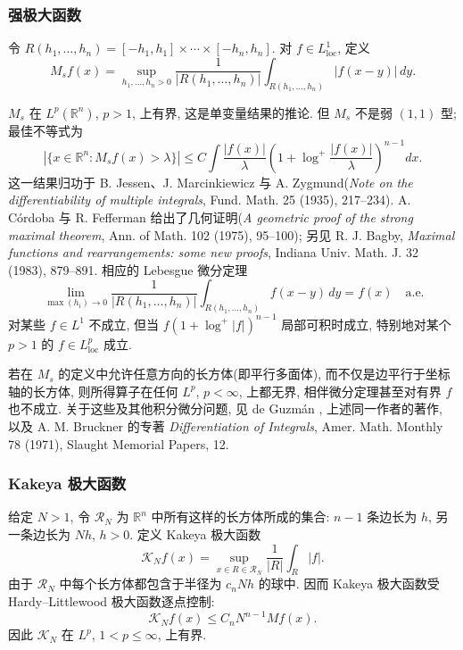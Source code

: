 \subsubsection{强极大函数}
\label{subsec:ch2-strong-maximal}
令 $R(h_1,\ldots,h_n)=[-h_1,h_1]\times\cdots\times[-h_n,h_n]$. 对 $f\in L^1_{\mathrm{loc}}$, 定义
\[
 M_sf(x)=\sup_{h_1,\ldots,h_n>0}\frac1{|R(h_1,\ldots,h_n)|}\int_{R(h_1,\ldots,h_n)}|f(x-y)|\,dy.
\]

\hypertarget{chapter-02-page-058}{}
$M_s$ 在 $L^p(\mathbb R^n)$, $p>1$, 上有界, 这是单变量结果的推论. 但 $M_s$ 不是弱 $(1,1)$ 型; 最佳不等式为
\[
 |\{x\in\mathbb R^n:M_sf(x)>\lambda\}|\le C\int\frac{|f(x)|}{\lambda}\left(1+\log^+\frac{|f(x)|}{\lambda}\right)^{n-1}dx.
\]
这一结果归功于 B. Jessen、J. Marcinkiewicz 与 A. Zygmund(\emph{Note on the differentiability of multiple integrals}, Fund. Math. 25 (1935), 217--234). A. Córdoba 与 R. Fefferman 给出了几何证明(\emph{A geometric proof of the strong maximal theorem}, Ann. of Math. 102 (1975), 95--100); 另见 R. J. Bagby, \emph{Maximal functions and rearrangements: some new proofs}, Indiana Univ. Math. J. 32 (1983), 879--891. 相应的 Lebesgue 微分定理
\[
 \lim_{\max(h_i)\to0}\frac1{|R(h_1,\ldots,h_n)|}\int_{R(h_1,\ldots,h_n)}f(x-y)\,dy=f(x)\quad\text{a.e.}
\]
对某些 $f\in L^1$ 不成立, 但当 $f(1+\log^+|f|)^{n-1}$ 局部可积时成立, 特别地对某个 $p>1$ 的 $f\in L^p_{\mathrm{loc}}$ 成立.

若在 $M_s$ 的定义中允许任意方向的长方体(即平行多面体), 而不仅是边平行于坐标轴的长方体, 则所得算子在任何 $L^p$, $p<\infty$, 上都无界, 相伴微分定理甚至对有界 $f$ 也不成立. 关于这些及其他积分微分问题, 见 de Guzmán , 上述同一作者的著作, 以及 A. M. Bruckner 的专著 \emph{Differentiation of Integrals}, Amer. Math. Monthly 78 (1971), Slaught Memorial Papers, 12.

\subsubsection{Kakeya 极大函数}
\label{subsec:ch2-kakeya-maximal}
给定 $N>1$, 令 $\mathcal R_N$ 为 $\mathbb R^n$ 中所有这样的长方体所成的集合: $n-1$ 条边长为 $h$, 另一条边长为 $Nh$, $h>0$. 定义 Kakeya 极大函数
\[
 \mathcal K_Nf(x)=\sup_{x\in R\in\mathcal R_N}\frac1{|R|}\int_R|f|.
\]
由于 $\mathcal R_N$ 中每个长方体都包含于半径为 $c_nNh$ 的球中. 因而 Kakeya 极大函数受 Hardy--Littlewood 极大函数逐点控制:
\begin{equation}
\label{eq:ch2-kakeya-trivial-bound}
 \mathcal K_Nf(x)\le C_nN^{n-1}Mf(x).
\end{equation}
因此 $\mathcal K_N$ 在 $L^p$, $1<p\le\infty$, 上有界.


